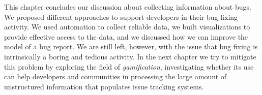 This chapter concludes our discussion about collecting information about bugs.
We proposed different approaches to support developers in their bug fixing activity.
We used automation to collect reliable data, we built visualizations to provide effective access to the data, and we discussed how we can improve the model of a bug report.
We are still left, however, with the issue that bug fixing is intrinsically a boring and tedious activity.
In the next chapter we try to mitigate this problem by exploring the field of \emph{gamification}, investigating whether its use can help developers and communities in processing the large amount of unstructured information that populates issue tracking systems.
